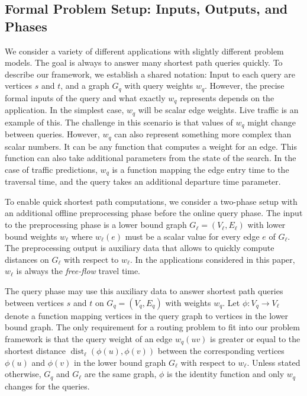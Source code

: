 \documentclass[manuscript]{acmart}
\newcommand*{\dist}{\operatorname{dist}}
\begin{document}
\subsection{Formal Problem Setup: Inputs, Outputs, and Phases}\label{sec:formal_framework}

We consider a variety of different applications with slightly different problem models.
The goal is always to answer many shortest path queries quickly.
To describe our framework, we establish a shared notation:
Input to each query are vertices $s$ and $t$, and a graph $G_q$ with query weights $w_q$.
However, the precise formal inputs of the query and what exactly $w_q$ represents depends on the application.
In the simplest case, $w_q$ will be scalar edge weights.
Live traffic is an example of this.
The challenge in this scenario is that values of $w_q$ might change between queries.
However, $w_q$ can also represent something more complex than scalar numbers.
It can be any function that computes a weight for an edge.
This function can also take additional parameters from the state of the search.
In the case of traffic predictions, $w_q$ is a function mapping the edge entry time to the traversal time, and the query takes an additional departure time parameter.

To enable quick shortest path computations, we consider a two-phase setup with an additional offline preprocessing phase before the online query phase.
The input to the preprocessing phase is a lower bound graph $G_\ell = (V_{\ell}, E_{\ell})$ with lower bound weights $w_\ell$ where $w_\ell(e)$ must be a scalar value for every edge $e$ of $G_\ell$.
The preprocessing output is auxiliary data that allows to quickly compute distances on $G_\ell$ with respect to $w_\ell$.
In the applications considered in this paper, $w_\ell$ is always the \emph{free-flow} travel time.

The query phase may use this auxiliary data to answer shortest path queries between vertices $s$ and $t$ on $G_q = (V_q, E_q)$ with weights $w_q$.
Let $\phi : V_q \to V_{\ell}$ denote a function mapping vertices in the query graph to vertices in the lower bound graph.
The only requirement for a routing problem to fit into our problem framework is that the query weight of an edge $w_q(u v)$ is greater or equal to the shortest distance $\dist_\ell(\phi(u), \phi(v))$ between the corresponding vertices $\phi(u)$ and $\phi(v)$ in the lower bound graph $G_\ell$ with respect to $w_\ell$.
Unless stated otherwise, $G_q$ and $G_\ell$ are the same graph, $\phi$ is the identity function and only $w_q$ changes for the queries.
\end{document}
